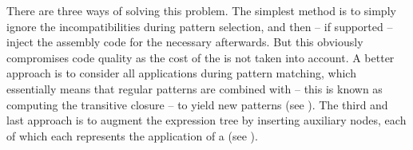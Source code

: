 {%
%      
%
%      
%      
%      
%

There are three ways of solving this problem.
%
The simplest method is to simply
ignore the incompatibilities during \gls{pattern selection}, and then -- if
supported -- inject the \gls{assembly code} for the necessary \tchainRules
afterwards.
%
But this obviously compromises code quality as the cost of the
\tchainRules is not taken into account.
%
A better approach is to consider all
\tchainRule applications during \gls{pattern matching}, which essentially means
that regular \glspl{pattern} are combined with \tchainRules\unskip%
 -- this is known as computing the \gls{transitive closure} -- to yield new
\glspl{pattern} (see
).
%
The third and last
approach is to augment the \gls{expression tree} by inserting auxiliary
\glspl{node}, each of which each represents the application of a \tchainRule
(see ).

}
